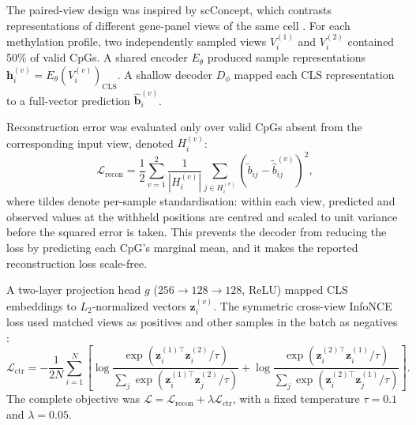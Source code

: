 The paired-view design was inspired by scConcept, which contrasts representations of different
gene-panel views of the same cell \citep{Bahrami2025}. For each methylation profile, two
independently sampled views $V_i^{(1)}$ and $V_i^{(2)}$ contained 50\% of valid CpGs. A shared
encoder $E_\theta$ produced sample representations
$\bm{h}_i^{(v)}=E_\theta(V_i^{(v)})_{\mathrm{CLS}}$. A shallow decoder $D_\phi$ mapped each
CLS representation to a full-vector prediction $\hat{\bm{b}}_i^{(v)}$.

Reconstruction error was evaluated only over valid CpGs absent from the corresponding input
view, denoted $H_i^{(v)}$:
\begin{equation}
 \mathcal{L}_{\mathrm{recon}} =
 \frac{1}{2}\sum_{v=1}^{2}\frac{1}{|H_i^{(v)}|}
 \sum_{j\in H_i^{(v)}}\left(\tilde b_{ij}-\widetilde{\hat b}_{ij}^{(v)}\right)^2,
\end{equation}
where tildes denote per-sample standardisation: within each view, predicted and observed
values at the withheld positions are centred and scaled to unit variance before the squared
error is taken. This prevents the decoder from reducing the loss by predicting each CpG's
marginal mean, and it makes the reported reconstruction loss scale-free.

A two-layer projection head $g$ ($256\rightarrow128\rightarrow128$, ReLU) mapped CLS
embeddings to $L_2$-normalized vectors $\bm{z}_i^{(v)}$. The symmetric cross-view InfoNCE loss
used matched views as positives and other samples in the batch as negatives \citep{Oord2018}:
\begin{equation}
 \mathcal{L}_{\mathrm{ctr}} = -\frac{1}{2N}\sum_{i=1}^{N}
 \left[
 \log\frac{\exp(\bm{z}_i^{(1)\top}\bm{z}_i^{(2)}/\tau)}
 {\sum_j\exp(\bm{z}_i^{(1)\top}\bm{z}_j^{(2)}/\tau)}+
 \log\frac{\exp(\bm{z}_i^{(2)\top}\bm{z}_i^{(1)}/\tau)}
 {\sum_j\exp(\bm{z}_i^{(2)\top}\bm{z}_j^{(1)}/\tau)}
 \right].
\end{equation}
The complete objective was
$\mathcal{L}=\mathcal{L}_{\mathrm{recon}}+\lambda\mathcal{L}_{\mathrm{ctr}}$, with a fixed
temperature $\tau=0.1$ and $\lambda=0.05$.

